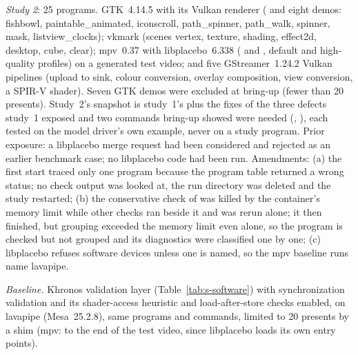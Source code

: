 \emph{Study 2}: 25 programs. GTK~4.14.5 with its Vulkan renderer
( and eight  demos: fishbowl, paintable\_animated, iconscroll,
path\_spinner, path\_walk, spinner, mask, listview\_clocks); vkmark (scenes vertex, texture, shading, effect2d,
desktop, cube, clear); mpv~0.37 with libplacebo~6.338 ( and , default and high-quality
profiles) on a generated test video; and five GStreamer~1.24.2 Vulkan pipelines (upload to sink, colour conversion,
overlay composition, view conversion, a SPIR-V shader). Seven GTK demos were excluded at bring-up (fewer than 20
presents). Study~2's snapshot is study~1's plus the fixes of the three defects study~1 exposed and two commands
bring-up showed were needed (, ), each tested on the model driver's own
example, never on a study program. Prior exposure: a libplacebo merge request had been considered and rejected as an
earlier benchmark case; no libplacebo code had been run. Amendments: (a) the first start traced only one program
because the program table returned a wrong status; no check output was looked at, the run directory was deleted and
the study restarted; (b) the conservative check of  was killed by the container's memory limit
while other checks ran beside it and was rerun alone; it then finished, but grouping exceeded the memory limit even
alone, so the program is checked but not grouped and its diagnostics were classified one by one; (c) libplacebo refuses software devices unless one is named, so
the mpv baseline runs name lavapipe.

\emph{Baseline.} Khronos validation layer (Table~\ref{tab:s-software}) with synchronization validation and its shader-access
heuristic and load-after-store checks enabled, on lavapipe (Mesa~25.2.8), same programs and commands, limited to 20
presents by a shim (mpv: to the end of the test video, since libplacebo loads its own entry points).

